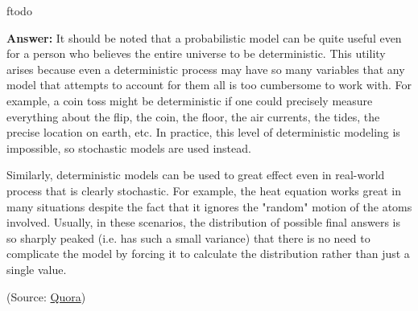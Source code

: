 ƒtodo\documentclass{article}
\newenvironment{QandA}{\begin{enumerate}[label=\arabic*.]}{\end{enumerate}}
\newenvironment{answer}{\par\normalfont \textbf{Answer:}}{}
\begin{document}
\begin{QandA}
\begin{answer}
        It should be noted that a probabilistic model can be quite useful even for a person who believes the entire universe to be deterministic. This utility arises because even a deterministic process may have so many variables that any model that attempts to account for them all is too cumbersome to work with. For example, a coin toss might be deterministic if one could precisely measure everything about the flip, the coin, the floor, the air currents, the tides, the precise location on earth, etc. In practice, this level of deterministic modeling is impossible, so stochastic models are used instead. 
        
        Similarly, deterministic models can be used to great effect even in real-world process that is clearly stochastic. For example, the heat equation works great in many situations despite the fact that it ignores the "random" motion of the atoms involved. Usually, in these scenarios, the distribution of possible final answers is so sharply peaked (i.e. has such a small variance) that there is no need to complicate the model by forcing it to calculate the distribution rather than just a single value.
        
        (Source: \href{https://www.quora.com/What-is-the-difference-between-probabilistic-and-deterministic-models}{Quora})
    \end{answer}


\end{QandA}
\end{document}

